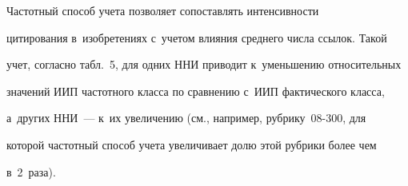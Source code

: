      


     Частотный способ учета позволяет сопоставлять интенсивности 


цитирования в~изобретениях с~учетом влияния среднего числа ссылок. Такой 


учет, согласно табл.~5, для одних ННИ приводит к~уменьшению относительных 


значений ИИП частотного класса по сравнению с~ИИП фактического класса, 


а~других ННИ~--- к~их увеличению (см., например, рубрику~08-300, для 


которой частотный способ учета увеличивает долю этой рубрики более чем 


в~2~раза).





\vspace*{-4pt}






